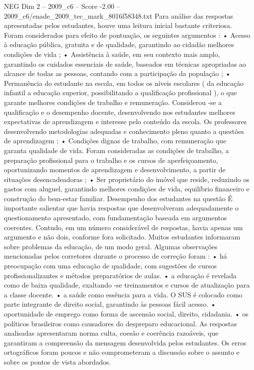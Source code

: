 \begin{textsample}{NEG Dim 2 – 2009\_c6 – Score -2.00 – 2009\_c6/enade\_2009\_tec\_mark\_8016f58348.txt}
Para análise das respostas apresentadas pelos estudantes, houve uma leitura inicial bastante criteriosa.
Foram considerados para efeito de pontuação, os seguintes argumentos : • Acesso à educação pública, gratuita e de qualidade, garantindo ao cidadão melhores condições de vida ; • Assistência à saúde, em seu contexto mais amplo, garantindo os cuidados essenciais de saúde, baseados em técnicas apropriadas ao alcance de todas as pessoas, contando com a participação da população ; • Permanência do estudante na escola, em todos os níveis escolares ( da educação infantil a educação superior, possibilitando a qualificação profissional ), o que garante melhores condições de trabalho e remuneração.
Considerou -se a qualificação e o desempenho docente, desenvolvendo nos estudantes melhores expectativas de aprendizagem e interesse pelo conteúdo da escola.
Os professores desenvolvendo metodologias adequadas e conhecimento pleno quanto a questões de aprendizagem ; • Condições dignas de trabalho, com remuneração que garanta qualidade de vida.
Foram consideradas as condições de trabalho, a preparação profissional para o trabalho e os cursos de aperfeiçoamento, oportunizando momentos de aprendizagem e desenvolvimento, a partir de situações desencadeadoras ; • Ser proprietário do imóvel que reside, reduzindo os gastos com aluguel, garantindo melhores condições de vida, equilíbrio financeiro e construção do bem-estar familiar.
Desempenho dos estudantes na questão É importante salientar que havia respostas que desenvolveram adequadamente o questionamento apresentado, com fundamentação baseada em argumentos coerentes.
Contudo, em um número considerável de respostas, havia apenas um argumento e não dois, conforme fora solicitado.
Muitos estudantes informaram sobre problemas da educação, de um modo geral.
Algumas observações mencionadas pelos corretores durante o processo de correção foram : • há preocupação com uma educação de qualidade, com sugestões de cursos profissionalizantes e métodos preparatórios de aulas. • a educação é revelada como de baixa qualidade, exaltando -se treinamentos e cursos de atualização para a classe docente. • a saúde como essência para a vida.
O SUS é colocado como parte integrante de direito social, garantindo às pessoas fácil acesso. • oportunidade de emprego como forma de ascensão social, direito, cidadania. • os políticos brasileiros como causadores do despreparo educacional.
As respostas analisadas apresentaram norma culta, coesão e coerência razoáveis, que garantiram a compreensão da mensagem desenvolvida pelos estudantes.
Os erros ortográficos foram poucos e não comprometeram a discussão sobre o assunto e sobre os pontos de vista abordados.

\end{textsample}
